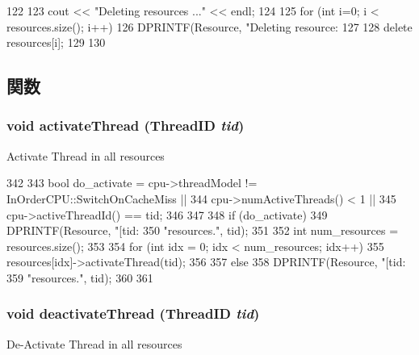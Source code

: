 \begin{DoxyCode}
122 {
123     cout << "Deleting resources ..." << endl;
124     
125     for (int i=0; i < resources.size(); i++) {
126         DPRINTF(Resource, "Deleting resource: %
127         
128         delete resources[i];
129     }    
130 }
\end{DoxyCode}


\subsection{関数}
\hypertarget{classResourcePool_a687aa4600423bb30ecf3bb1da6cd6000}{
\subsubsection[{activateThread}]{\setlength{\rightskip}{0pt plus 5cm}void activateThread ({\bf ThreadID} {\em tid})}}
\label{classResourcePool_a687aa4600423bb30ecf3bb1da6cd6000}
Activate Thread in all resources 


\begin{DoxyCode}
342 {
343     bool do_activate = cpu->threadModel != InOrderCPU::SwitchOnCacheMiss ||
344         cpu->numActiveThreads() < 1 ||
345         cpu->activeThreadId() == tid;
346     
347         
348     if (do_activate) {
349         DPRINTF(Resource, "[tid:%
350                     "resources.\n", tid);
351  
352         int num_resources = resources.size();
353  
354         for (int idx = 0; idx < num_resources; idx++) {
355             resources[idx]->activateThread(tid);
356         }
357     } else {
358         DPRINTF(Resource, "[tid:%
359                     "resources.\n", tid);
360      }
361 }
\end{DoxyCode}
\hypertarget{classResourcePool_ad11d9216ad92d9036ebf37844cf6e706}{
\subsubsection[{deactivateThread}]{\setlength{\rightskip}{0pt plus 5cm}void deactivateThread ({\bf ThreadID} {\em tid})}}
\label{classResourcePool_ad11d9216ad92d9036ebf37844cf6e706}
De-\/Activate Thread in all resources 


